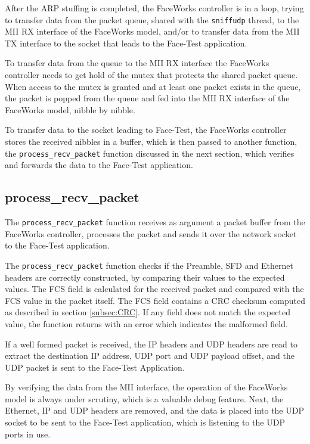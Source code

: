 \documentclass[conference]{IEEEtran}
\begin{document}
After the ARP stuffing is completed, the FaceWorks controller is in a loop, trying to transfer data from the packet queue, shared with the \texttt{sniffudp} thread, to the MII RX interface of the FaceWorks model, and/or to transfer data from the MII TX interface to the socket that leads to the Face-Test application.

To transfer data from the queue to the MII RX interface the FaceWorks controller needs to get hold of the mutex that protects the shared packet queue. When access to the mutex is granted and at least one packet exists in the queue, the packet is popped from the queue and fed into the MII RX interface of the FaceWorks model, nibble by nibble.

To transfer data to the socket leading to Face-Test, the FaceWorks controller  stores the received nibbles in a buffer, which is then passed to another function, the \texttt{process\_recv\_packet} function discussed in the next section, which verifies and forwards the data to the Face-Test application.


\subsection{process\_recv\_packet}
\label{subsec:process_recv}

The \texttt{process\_recv\_packet} function receives as argument a packet buffer from the FaceWorks controller, processes the packet and sends it over the network socket to the Face-Test application.

The \texttt{process\_recv\_packet} function checks if the Preamble, SFD and Ethernet headers are correctly constructed, by comparing their values to the expected values. The FCS field is calculated for the received packet and compared with the FCS value in the packet itself. The FCS field contains a CRC checksum computed as described in section \ref{subsec:CRC}. If any field does not match the expected value, the function returns with an error which indicates the malformed field.

If a well formed packet is received, the IP headers and UDP headers are read to extract the destination IP address, UDP port and UDP payload offset, and the UDP packet is sent to the Face-Test Application.

By verifying the data from the MII interface, the operation of the FaceWorks model is always under scrutiny, which is a valuable debug feature. Next, the Ethernet, IP and UDP headers are removed,  and the data is placed into the UDP socket to be sent to the Face-Test application, which is listening to the UDP ports in use.
\end{document}

